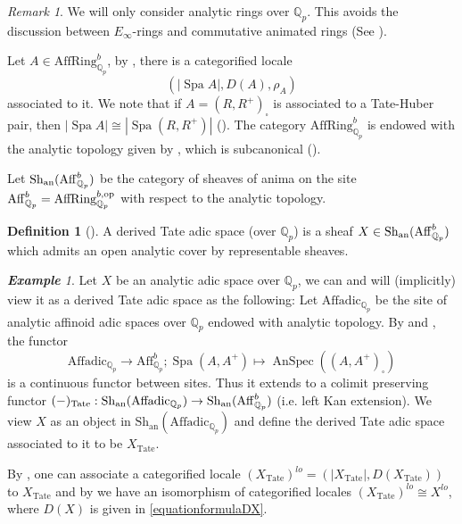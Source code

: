 \documentclass[a4paper,10pt]{amsart}
\theoremstyle{remark}
\newtheorem{example}[theorem]{\bf Example}
\newtheorem{remark}[theorem]{Remark}
\theoremstyle{definition}
\newtheorem{definition}[theorem]{Definition}
\theoremstyle{plain}
\numberwithin{equation}{section}
\newcommand{\bbQ}{{\mathbb Q}}
\newcommand{\an}{{\rm an}}
\newcommand{\Tate}{\mathrm{Tate}}
\newcommand{\AffRingQp}{{\mathrm{AffRing}^b_{\mathbb{Q}_p}}}
\newcommand{\AffQp}{{\mathrm{Aff}^b_{\mathbb{Q}_p}}}
\newcommand{\Sh}{{\mathrm{Sh}}}
\DeclareMathOperator{\Spa}{Spa}
\DeclareMathOperator{\AnSpec}{AnSpec}
\begin{document}
\begin{remark}
 We will only consider analytic rings over $\bbQ_p$. This avoids the discussion between $E_{\infty}$-rings and commutative animated rings (See \cite[Rem.~2.1.4]{camargo2024analytic}). 
  \end{remark}
  
Let $A\in \AffRingQp$, by \cite[Thm.~2.7.2, Def.~2.7.3]{camargo2024analytic}, there is a categorified locale 
\[(|\Spa A|,D(A),\rho_A)\] 
associated to it. We note that if $A=(R,R^+)_\square$ is associated to a Tate-Huber pair, then $|\Spa A|\cong |\Spa(R,R^+)|$ (\cite[Prop.~2.7.8(3)]{camargo2024analytic}). The category $\AffRingQp$ is endowed with the analytic topology given by \cite[Def.~2.7.20]{camargo2024analytic}, which is subcanonical (\cite[Lem.~2.7.21]{camargo2024analytic}). 

Let $\Sh_{\an}(\AffQp)$ be the category of sheaves of anima on the site $\AffQp=\mathrm{AffRing}_{\bbQ_p}^{b,\rm op}$ with respect to the analytic topology.
 \begin{definition}[{\cite[Def.~2.7.22]{camargo2024analytic}}]
 	A derived Tate adic space (over $\bbQ_p$) is a sheaf $X\in \Sh_{\an}(\AffQp)$ which admits an open analytic cover by representable sheaves.
 \end{definition}
 
 \begin{example}\label{examtatespace}
Let $X$ be an analytic adic space over $\bbQ_p$, we can and will (implicitly) view it as a derived Tate adic space as the following: Let $\mathrm{Affadic}_{\bbQ_p}$ be the site of analytic affinoid adic spaces over $\bbQ_p$ endowed with analytic topology. By \cite[Prop.~2.7.8]{camargo2024analytic} and \cite[Prop.~4.12]{andreychev2021pseudocoherent}, the functor 
\begin{equation}\label{equationfunctoraffinoidtobounded}
	\mathrm{Affadic}_{\bbQ_p}\to \AffQp; \Spa(A,A^+)\mapsto \AnSpec ((A,A^+)_\square)	
\end{equation}
is a continuous functor between sites. Thus it extends to a colimit preserving functor $(-)_{\Tate}:\Sh_{\mathrm{\an}}(\mathrm{Affadic}_{\bbQ_p})\to \Sh_{\an}(\AffQp)$ (i.e. left Kan extension). We view $X$ as an object in $\Sh_{\mathrm{an}}(\mathrm{Affadic}_{\bbQ_p})$ and define the derived Tate adic space associated to it to be $X_\Tate$.
 
 By \cite[Def.~2.7.22]{camargo2024analytic}, one can associate a categorified locale $(X_{\Tate})^{lo}=(|X_{\Tate}|,D(X_{\Tate}))$ to $X_{\Tate}$ and by  \cite[Cor.~2.7.23]{camargo2024analytic} we have an isomorphism of categorified locales $(X_{\Tate})^{lo}\cong X^{lo}$, where $D(X)$ is given in \eqref{equationformulaDX}.
 \end{example}
 
\end{document}

